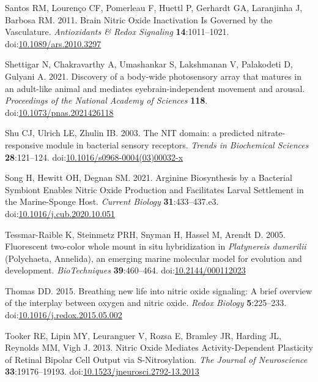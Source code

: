 \documentclass[
  10pt,
  onecolumn]{article}
\newlength{\cslhangindent}
\newlength{\cslentryspacingunit} %
\newenvironment{CSLReferences}[2] %
 {%
  \setlength{\parindent}{0pt}
  \ifodd #1
  \let\oldpar\par
  \def\par{\hangindent=\cslhangindent\oldpar}
  \fi
  \setlength{\parskip}{#2\cslentryspacingunit}
 }%
 {}
\begin{document}
\begin{CSLReferences}{1}{0}
\leavevmode{}%
Santos RM, Lourenço CF, Pomerleau F, Huettl P, Gerhardt GA, Laranjinha
J, Barbosa RM. 2011. Brain Nitric Oxide Inactivation Is Governed by the
Vasculature. \emph{Antioxidants \& Redox Signaling}
\textbf{14}:1011--1021.
doi:\href{https://doi.org/10.1089/ars.2010.3297}{10.1089/ars.2010.3297}

\leavevmode{}%
Shettigar N, Chakravarthy A, Umashankar S, Lakshmanan V, Palakodeti D,
Gulyani A. 2021. Discovery of a body-wide photosensory array that
matures in an adult-like animal and mediates
eye{\textendash}brain-independent movement and arousal.
\emph{Proceedings of the National Academy of Sciences} \textbf{118}.
doi:\href{https://doi.org/10.1073/pnas.2021426118}{10.1073/pnas.2021426118}

\leavevmode{}%
Shu CJ, Ulrich LE, Zhulin IB. 2003. The NIT domain: a predicted
nitrate-responsive module in bacterial sensory receptors. \emph{Trends
in Biochemical Sciences} \textbf{28}:121--124.
doi:\href{https://doi.org/10.1016/s0968-0004(03)00032-x}{10.1016/s0968-0004(03)00032-x}

\leavevmode{}%
Song H, Hewitt OH, Degnan SM. 2021. Arginine Biosynthesis by a Bacterial
Symbiont Enables Nitric Oxide Production and Facilitates Larval
Settlement in the Marine-Sponge Host. \emph{Current Biology}
\textbf{31}:433--437.e3.
doi:\href{https://doi.org/10.1016/j.cub.2020.10.051}{10.1016/j.cub.2020.10.051}

\leavevmode{}%
Tessmar-Raible K, Steinmetz PRH, Snyman H, Hassel M, Arendt D. 2005.
Fluorescent two-color whole mount in situ hybridization in
{\emph{Platynereis dumerilii}} (Polychaeta, Annelida), an emerging
marine molecular model for evolution and development.
\emph{BioTechniques} \textbf{39}:460--464.
doi:\href{https://doi.org/10.2144/000112023}{10.2144/000112023}

\leavevmode{}%
Thomas DD. 2015. Breathing new life into nitric oxide signaling: A brief
overview of the interplay between oxygen and nitric oxide. \emph{Redox
Biology} \textbf{5}:225--233.
doi:\href{https://doi.org/10.1016/j.redox.2015.05.002}{10.1016/j.redox.2015.05.002}

\leavevmode{}%
Tooker RE, Lipin MY, Leuranguer V, Rozsa E, Bramley JR, Harding JL,
Reynolds MM, Vigh J. 2013. Nitric Oxide Mediates Activity-Dependent
Plasticity of Retinal Bipolar Cell Output via S-Nitrosylation. \emph{The
Journal of Neuroscience} \textbf{33}:19176--19193.
doi:\href{https://doi.org/10.1523/jneurosci.2792-13.2013}{10.1523/jneurosci.2792-13.2013}


\end{CSLReferences}
\end{document}
